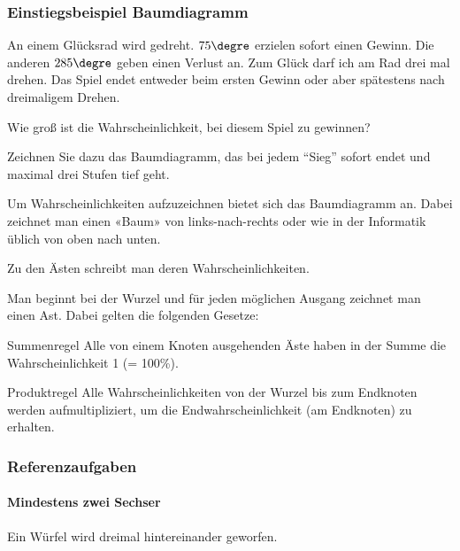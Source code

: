 
\subsubsection{Einstiegsbeispiel Baumdiagramm}
An einem Glücksrad wird gedreht. $75\degre$ erzielen sofort einen Gewinn. Die anderen $285\degre$ geben einen Verlust an. Zum Glück darf ich am Rad drei mal drehen. Das Spiel endet entweder beim ersten Gewinn oder aber spätestens nach dreimaligem Drehen.

Wie groß ist die Wahrscheinlichkeit, bei diesem Spiel zu gewinnen?

Zeichnen Sie dazu das Baumdiagramm, das bei jedem ``Sieg'' sofort endet und
maximal drei Stufen tief geht.



\newpage

Um Wahrscheinlichkeiten aufzuzeichnen bietet sich das Baumdiagramm an.
Dabei zeichnet man einen «Baum» von links-nach-rechts oder wie in der Informatik üblich von oben nach unten.

Zu den Ästen schreibt man deren Wahrscheinlichkeiten.

Man beginnt bei der Wurzel und für jeden möglichen Ausgang zeichnet man einen Ast. Dabei gelten die folgenden Gesetze:

\begin{gesetz}{Summenregel}{}
Alle von einem Knoten ausgehenden Äste haben in der Summe die Wahrscheinlichkeit 1 (= 100\%).
\end{gesetz}

\begin{gesetz}{Produktregel}{}
Alle Wahrscheinlichkeiten von der Wurzel bis zum Endknoten werden aufmultipliziert, um die Endwahrscheinlichkeit (am Endknoten) zu erhalten.
\end{gesetz}

\newpage


\subsubsection{Referenzaufgaben}

\paragraph{Mindestens zwei Sechser} Ein Würfel wird dreimal hintereinander geworfen.

